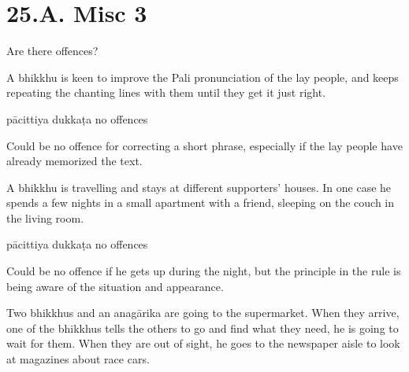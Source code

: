 \chapter{25.A. Misc 3}
\renewcommand*{\theChapterTitle}{25.A. Misc 3}

\begin{exam}{\autoExamName}

  \begin{problem*}

    Are there offences?

    \begin{parts}

      \item A bhikkhu is keen to improve the Pali pronunciation of the lay
      people, and keeps repeating the chanting lines with them until they get it
      just right.

      \bigskip

      \begin{answers}{3}
        \bChoices
         pācittiya\eAns
         dukkaṭa\eAns
         no offences\eAns
        \eChoices
      \end{answers}

      \begin{solution}
        Could be no offence for correcting a short phrase, especially if the lay people have already memorized the text.
      \end{solution}

      \bigskip

      \item A bhikkhu is travelling and stays at different supporters' houses.
      In one case he spends a few nights in a small apartment with a friend,
      sleeping on the couch in the living room.

      \bigskip

      \begin{answers}{3}
        \bChoices
         pācittiya\eAns
         dukkaṭa\eAns
         no offences\eAns
        \eChoices
      \end{answers}

      \begin{solution}
        Could be no offence if he gets up during the night, but the principle in
        the rule is being aware of the situation and appearance.
      \end{solution}

      \bigskip

      \item Two bhikkhus and an anagārika are going to the supermarket. When
      they arrive, one of the bhikkhus tells the others to go and find what they
      need, he is going to wait for them. When they are out of sight, he goes to
      the newspaper aisle to look at magazines about race cars.


\end{parts}
\end{problem*}
\end{exam}
